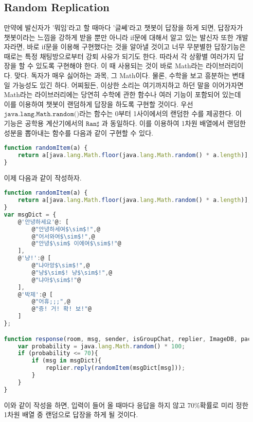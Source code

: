 \documentclass[10pt,a4paper,final]{book}
\begin{document}
\chapter{}

\section{Random Replication}

만약에 발신자가 '뭐임'라고 할 때마다 '글쎄'라고 챗봇이 답장을 하게 되면, 답장자가 챗봇이라는
느낌을 강하게 받을 뿐만 아니라 if문에 대해서 알고 있는 발신자 또한 개발자라면, 바로 if문을
이용해 구현했다는 것을 알아낼 것이고 너무 무분별한 답장기능은 때로는 특정 채팅방으로부터 강퇴
사유가 되기도 한다. 따라서 각 상황별 여러가지 답장을 할 수 있도록 구현해야 한다. 이 때 사용되는
것이 바로 Math라는 라이브러리이다. 맞다. 독자가 매우 싫어하는 과목, 그 Math이다. 물론, 수학을
보고 흥분하는 변태일 가능성도 있긴 하다. 어찌됬든, 이상한 소리는 여기까지하고 하던 말을 이어가자면
Math라는 라이브러리에는 당연히 수학에 관한 함수나 여러 기능이 포함되어 있는데 이를 이용하여
챗봇이 랜덤하게 답장을 하도록 구현할 것이다.
우선 $\texttt{java.lang.Math.random()}$라는 함수는 0부터 1사이에서의 랜덤한 수를 제공한다.
이 기능은 공학용 계산기에서의 $\texttt{Ran}\sharp$ 과 동일하다.
이를 이용하여 1차원 배열에서 랜덤한 성분을 뽑아내는 함수를 다음과 같이 구현할 수 있다.
\begin{lstlisting}[language=JavaScript,escapeinside=~~, caption={$\texttt{randomItem(array)}$}]
function randomItem(a) {
    return a[java.lang.Math.floor(java.lang.Math.random() * a.length)];
}
\end{lstlisting}
이제 다음과 같이 작성하자.
\begin{lstlisting}[language=JavaScript,escapeinside=@@]
function randomItem(a) {
    return a[java.lang.Math.floor(java.lang.Math.random() * a.length)];
}
var msgDict = {
    @'안녕하세요'@: [
        @"안녕하세여$\sim$!",@
        @"어서와여$\sim$!",@
        @"안녕$\sim$ 이에여$\sim$!"@
    ],
    @'냥!':@ [
        @"냐아앙$\sim$!",@
        @"냥$\sim$! 냥$\sim$!",@
        @"냐아$\sim$!"@
    ],
    @'박제':@ [
        @"어휴;;;",@
        @"증! 거! 확! 보!"@
    ]
};

function response(room, msg, sender, isGroupChat, replier, ImageDB, packageName, threadId){
    var probability = java.lang.Math.random() * 100;
    if (probability <= 70){
        if (msg in msgDict){
            replier.reply(randomItem(msgDict[msg]));
        }
    }
}
\end{lstlisting}
이와 같이 작성을 하면, 입력이 들어 올 때마다 응답을 하지 않고 70\%확률로 미리 정한 1차원 배열 중 랜덤으로
답장을 하게 될 것이다.
\end{document}
